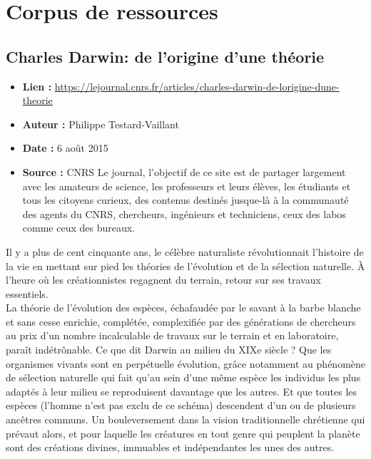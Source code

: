 \documentclass[8pt]{article}
\begin{document}
\newpage
\section{Corpus de ressources}
\subsection{Charles Darwin: de l’origine d’une théorie}

\begin{itemize}
	\item \textbf{Lien : }  \url{https://lejournal.cnrs.fr/articles/charles-darwin-de-lorigine-dune-theorie} 
	\item \textbf{Auteur : } Philippe Testard-Vaillant
	\item \textbf{Date : }  6 août 2015
	\item \textbf{Source : } CNRS Le journal, l'objectif de ce site est de partager largement avec les amateurs de science, les professeurs et leurs élèves, les étudiants et tous les citoyens curieux, des contenus destinés jusque-là à la communauté des agents du CNRS, chercheurs, ingénieurs et techniciens, ceux des labos comme ceux des bureaux.
\end{itemize}

Il y a plus de cent cinquante ans, le célèbre naturaliste révolutionnait l’histoire de la vie en mettant sur pied les théories de l’évolution et de la sélection naturelle. À l’heure où les créationnistes regagnent du terrain, retour sur ses travaux essentiels. \\

La théorie de l’évolution des espèces, échafaudée par le savant à la barbe blanche et sans cesse enrichie, complétée, complexifiée par des générations de chercheurs au prix d’un nombre incalculable de travaux sur le terrain et en laboratoire, paraît indétrônable. Ce que dit Darwin au milieu du XIXe siècle ? Que les organismes vivants sont en perpétuelle évolution, grâce notamment au phénomène de sélection naturelle qui fait qu’au sein d’une même espèce les individus les plus adaptés à leur milieu se reproduisent davantage que les autres. Et que toutes les espèces (l’homme n’est pas exclu de ce schéma) descendent d’un ou de plusieurs ancêtres communs. Un bouleversement dans la vision traditionnelle chrétienne qui prévaut alors, et pour laquelle les créatures en tout genre qui peuplent la planète sont des créations divines, immuables et indépendantes les unes des autres.\\
\end{document}
